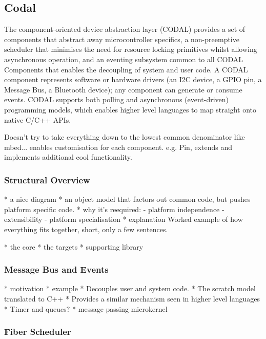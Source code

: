 \subsection{Codal}


The component-oriented device abstraction layer (CODAL) provides a set of components that abstract away microcontroller specifics, a non-preemptive scheduler that minimises the need for resource locking primitives whilst allowing asynchronous operation, and an eventing subsystem common to all CODAL Components that enables the decoupling of system and user code. A CODAL component represents software or hardware drivers (an I2C device, a GPIO pin, a Message Bus, a Bluetooth device); any component can generate or consume events. CODAL supports both polling and asynchronous (event-driven) programming models, which enables higher level languages to map straight onto native C/C++ APIs.

Doesn't try to take everything down to the lowest common denominator like mbed... enables customisation for each component. e.g. Pin, extends and implements additional cool functionality.

\subsubsection{Structural Overview}

* a nice diagram
* an object model that factors out common code, but pushes platform specific code.
* why it's reequired:
    - platform independence
    - extensibility
    - platform specialisation
* explanation
Worked example of how everything fits together, short, only a few sentences.

* the core
* the targets
* supporting library

\subsubsection{Message Bus and Events}

* motivation
* example
* Decouples user and system code.
* The scratch model translated to C++
* Provides a similar mechanism seen in higher level languages
* Timer and queues?
* message passing microkernel

\subsubsection{Fiber Scheduler}

